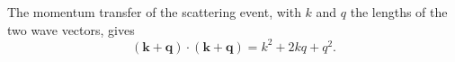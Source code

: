 \documentclass{article}
\begin{document}
The momentum transfer of the scattering event, with $k$ and $q$ the lengths of the two wave vectors, gives
\begin{equation}
(\mathbf{k}+\mathbf{q})\cdot(\mathbf{k}+\mathbf{q}) = k^2 + 2kq + q^2 .
\label{eq:kq}
\end{equation}
\end{document}

